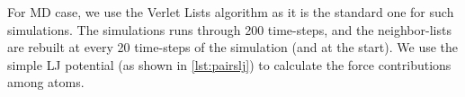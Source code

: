 \documentclass[Afour,sageh,times]{sagej}
\begin{document}

For \ac{MD} case, we use the Verlet Lists algorithm as it is the standard one for such simulations.
The simulations runs through 200 time-steps, and the neighbor-lists are rebuilt at every 20 time-steps of the simulation (and at the start).
We use the simple \ac{LJ} potential (as shown in \autoref{lst:pairslj}) to calculate the force contributions among atoms.

\end{document}
